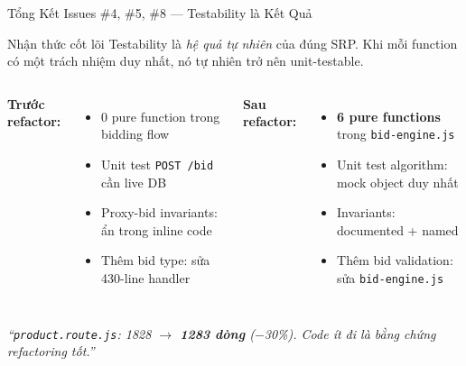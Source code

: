 \documentclass[12pt]{beamer}
\begin{document}
\begin{frame}{Tổng Kết Issues \#4, \#5, \#8 — Testability là Kết Quả}
  \begin{block}{Nhận thức cốt lõi}
    Testability là \emph{hệ quả tự nhiên} của đúng SRP. Khi mỗi function có một trách nhiệm duy nhất, nó tự nhiên trở nên unit-testable.
  \end{block}

  \medskip
  \begin{columns}[t]
    \textbf{Trước refactor:}
    \begin{itemize}
      \item 0 pure function trong bidding flow
      \item Unit test \texttt{POST /bid} cần live DB
      \item Proxy-bid invariants: ẩn trong inline code
      \item Thêm bid type: sửa 430-line handler
    \end{itemize}

    \textbf{Sau refactor:}
    \begin{itemize}
      \item \textbf{6 pure functions} trong \texttt{bid-engine.js}
      \item Unit test algorithm: mock object duy nhất
      \item Invariants: documented + named
      \item Thêm bid validation: sửa \texttt{bid-engine.js}
    \end{itemize}
  \end{columns}

  \medskip
  \begin{center}
    \textit{``\texttt{product.route.js}: 1828 $\to$ \textbf{1283 dòng} ($-$30\%). Code ít đi là bằng chứng refactoring tốt.''}
  \end{center}
\end{frame}
\end{document}
